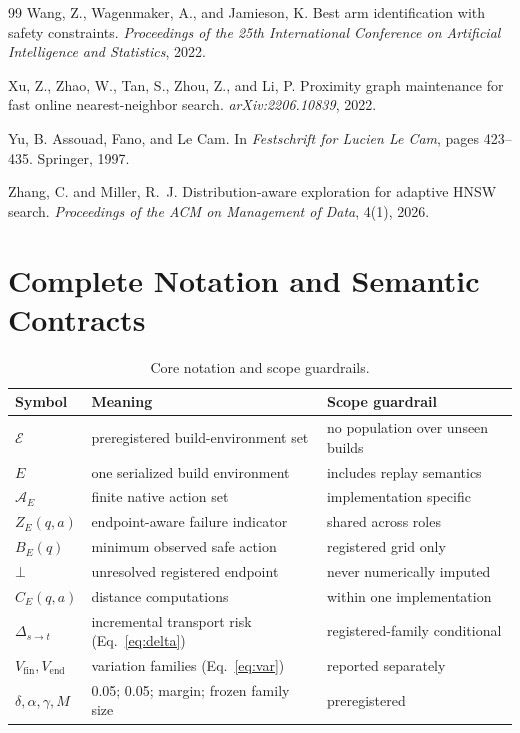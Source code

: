 \documentclass{article}
\newcommand{\Acal}{\mathcal{A}}
\newcommand{\Ecal}{\mathcal{E}}
\newcommand{\BOT}{\bot}
\begin{document}
\begin{thebibliography}{99}
Wang, Z., Wagenmaker, A., and Jamieson, K.
Best arm identification with safety constraints.
\emph{Proceedings of the 25th International Conference on Artificial Intelligence and Statistics}, 2022.

Xu, Z., Zhao, W., Tan, S., Zhou, Z., and Li, P.
Proximity graph maintenance for fast online nearest-neighbor search.
\emph{arXiv:2206.10839}, 2022.

Yu, B.
Assouad, Fano, and Le Cam.
In \emph{Festschrift for Lucien Le Cam}, pages 423--435. Springer, 1997.

Zhang, C. and Miller, R.~J.
Distribution-aware exploration for adaptive HNSW search.
\emph{Proceedings of the ACM on Management of Data}, 4(1), 2026.

\end{thebibliography}

\appendix

\section{Complete Notation and Semantic Contracts}
\label{app:notation}

\begin{table}[h]
\centering
\caption{Core notation and scope guardrails.}
\small
\begin{tabular}{lll}
\toprule
Symbol & Meaning & Scope guardrail \\
\midrule
$\Ecal$ & preregistered build-environment set & no population over unseen builds \\
$E$ & one serialized build environment & includes replay semantics \\
$\Acal_E$ & finite native action set & implementation specific \\
$Z_E(q,a)$ & endpoint-aware failure indicator & shared across roles \\
$B_E(q)$ & minimum observed safe action & registered grid only \\
$\BOT$ & unresolved registered endpoint & never numerically imputed \\
$C_E(q,a)$ & distance computations & within one implementation \\
$\Delta_{s\to t}$ & incremental transport risk (Eq.~\ref{eq:delta}) & registered-family conditional \\
$V_{\mathrm{fin}},V_{\mathrm{end}}$ & variation families (Eq.~\ref{eq:var}) & reported separately \\
$\delta,\alpha,\gamma,M$ & 0.05; 0.05; margin; frozen family size & preregistered \\
\bottomrule
\end{tabular}
\end{table}
\end{document}
